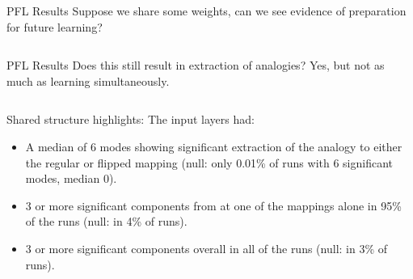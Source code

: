\documentclass{beamer}
\begin{document}
\begin{frame}{PFL Results}
Suppose we share some weights, can we see evidence of preparation for future learning?\\[11pt]
\begin{columns}
\end{columns}
\end{frame}

\begin{frame}{PFL Results}
Does this still result in extraction of analogies? Yes, but not as much as learning simultaneously.\\[11pt]
\begin{columns}
\end{columns}
\end{frame}

\begin{frame}{Shared structure highlights:}
The input layers had:
\begin{itemize}
    \item<1-> A median of 6 modes showing significant extraction of the analogy to either the regular or flipped mapping (null: only 0.01\% of runs with 6 significant modes, median 0).
    \item<2-> 3 or more significant components from at one of the mappings alone in 95\% of the runs (null: in 4\% of runs).
    \item<3-> 3 or more significant components overall in all of the runs (null: in 3\% of runs).
\end{itemize}
\end{frame}
\end{document}
